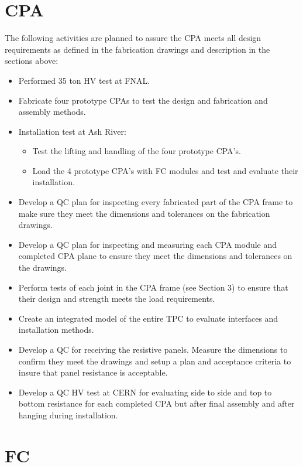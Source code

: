 \section{CPA}

The following activities are planned to assure the CPA meets all design requirements as defined in the fabrication drawings and description in the sections above:
\begin{itemize}
\item Performed 35 ton HV test at FNAL.
\item Fabricate four prototype CPAs to test the design and fabrication and assembly methods.
\item Installation test at Ash River:
\begin{itemize}
\item Test the lifting and handling of the four prototype CPA's.
\item  Load the 4 prototype CPA's with FC modules and test and evaluate their installation.
\end{itemize}
\item Develop a QC plan for inspecting every fabricated part of the CPA frame to make sure they meet the dimensions and tolerances on the fabrication drawings.
\item Develop a QC plan for inspecting and measuring each CPA module and completed CPA plane to ensure they meet the dimensions and tolerances on the drawings.
\item Perform tests of each joint in the CPA frame (see Section 3) to ensure that their design and strength meets the load requirements.
\item Create an integrated model of the entire TPC to evaluate interfaces and installation methods.  
\item Develop a QC for receiving the resistive panels.  Measure the dimensions to confirm they meet the drawings and setup a plan and acceptance criteria to insure that panel resistance is acceptable.
\item Develop a QC  HV test at CERN for evaluating side to side and top to bottom resistance for each completed CPA but after final assembly and after hanging during installation.  
\end{itemize}

\section{FC}

